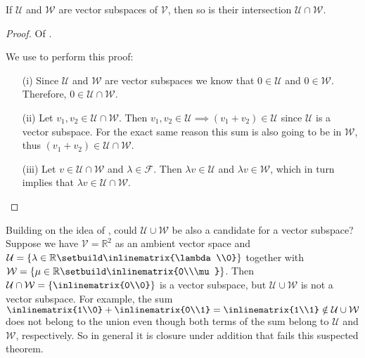 \begin{thm}\label{thm-intersection-vector-subspace}
	If $\mathcal{U}$ and $\mathcal{W}$ are vector subspaces of $\mathcal{V}$, then
	so is their intersection $\mathcal{U}\cap\mathcal{W}$.
\end{thm}

\begin{proof}
	Of .
	\begin{flushleft}
		We use  to perform this proof:
		\begin{enumerate}
			\item[(i)] Since $\mathcal{U}$ and $\mathcal{W}$ are vector subspaces
				we know that $0\in\mathcal{U}$ and $0\in\mathcal{W}$. Therefore,
				$0\in\mathcal{U}\cap\mathcal{W}$.
			\item[(ii)] Let $v_1,v_2\in\mathcal{U}\cap\mathcal{W}$. Then
				$v_1,v_2\in\mathcal{U}\implies(v_1+v_2)\in\mathcal{U}$ since $\mathcal{U}$
				is a vector subspace. For the exact same reason this sum is also going
				to be in $\mathcal{W}$, thus $(v_1+v_2)\in\mathcal{U}\cap\mathcal{W}$.
			\item[(iii)] Let $v\in\mathcal{U}\cap\mathcal{W}$ and $\lambda\in\mathcal{F}$.
				Then $\lambda v\in\mathcal{U}$ and $\lambda v\in\mathcal{W}$, which in
				turn implies that $\lambda v\in\mathcal{U}\cap\mathcal{W}$.
		\end{enumerate}
	\end{flushleft}
\end{proof}

\begin{exm}\label{exm-intersection-union-subspace}
	Building on the idea of ,
	could $\mathcal{U}\cup\mathcal{W}$ be also a candidate for a vector subspace?
	Suppose we have $\mathcal{V}=\mathbb{R}^2$ as an ambient vector space and
	$\mathcal{U}=\left\{\lambda\in\mathbb{R}\setbuild\inlinematrix{\lambda\\0}\right\}$
	together with
	$\mathcal{W}=\left\{\mu\in\mathbb{R}\setbuild\inlinematrix{0\\\mu}\right\}$.
	Then $\mathcal{U}\cap\mathcal{W}=\left\{\inlinematrix{0\\0}\right\}$ is a
	vector subspace, but $\mathcal{U}\cup\mathcal{W}$ is not a vector subspace.
	For example, the sum
	$\inlinematrix{1\\0}+\inlinematrix{0\\1}=\inlinematrix{1\\1}\notin\mathcal{U}\cup\mathcal{W}$
	does not belong to the union even though both terms of the sum belong to
	$\mathcal{U}$ and $\mathcal{W}$, respectively. So in general it is closure
	under addition that fails this suspected theorem.
\end{exm}

